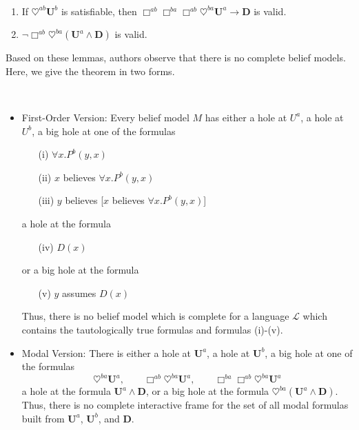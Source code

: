 \documentclass{article}
\begin{document}
\begin{lem}{\label{lemma-bk}} ~
\begin{enumerate}
\item If $\heartsuit^{ab} \mathbf{U}^b$ is satisfiable, then $\Box^{ab} \Box^{ba} \Box^{ab} \heartsuit^{ba} \mathbf{U}^a \rightarrow \mathbf{D}$ is valid.
\item $\neg \Box^{ab} \heartsuit^{ba} (\mathbf{U}^a \wedge \mathbf{D})$ is valid.
\end{enumerate} \end{lem}

Based on these lemmas, authors observe that there is no complete belief models. Here, we give the theorem in two forms.

\begin{thm} ~{\label{bk-thm}}
\begin{itemize}
\item First-Order Version: Every belief model $M$ has either a hole at $U^a$, a hole at $U^b$, a big hole at one of the formulas
\begin{itemize}
\item[(i)] $\forall x. P^b(y, x)$
\item[(ii)] $x$ believes $\forall x. P^b(y, x)$
\item[(iii)] $y$ believes [$x$ believes $\forall x. P^b(y, x)$]
\end{itemize}
a hole at the formula
\begin{itemize}
\item[(iv)] $D(x)$
\end{itemize}
or a big hole at the formula
\begin{itemize}
\item[(v)] $y$ assumes $D(x)$
\end{itemize}
Thus, there is no belief model which is complete for a language $\mathcal{L}$ which contains the tautologically true formulas and formulas (i)-(v).

\item Modal Version: There is either a hole at $\mathbf{U}^a$, a hole at $\mathbf{U}^b$, a big hole at one of the formulas $$\heartsuit^{ba}\mathbf{U}^a, \qquad  \Box^{ab} \heartsuit^{ba}\mathbf{U}^a, \qquad  \Box^{ba} \Box^{ab} \heartsuit^{ba}\mathbf{U}^a$$
a hole at the formula $\mathbf{U}^a \wedge \mathbf{D}$, or a big hole at the formula $\heartsuit^{ba}(\mathbf{U}^a \wedge \mathbf{D})$. Thus, there is no complete interactive frame for the set of all modal formulas built from $\mathbf{U}^a$, $\mathbf{U}^b$, and $\mathbf{D}$.
\end{itemize} \end{thm}
\end{document}
